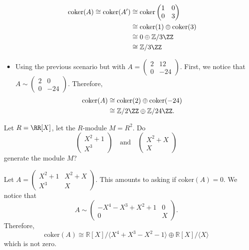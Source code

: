 \documentclass[12pt, a4paper]{article}
\begin{document}
\begin{mdexample}
\begin{itemize}
            \[
    \begin{aligned}
    \text{coker}(A) \cong \text{coker}(A') &\cong \text{coker}\begin{pmatrix} 1 & 0 \\ 0 & 3 \end{pmatrix} \\
    &\cong \text{coker}(1)\oplus \text{coker}(3) \\
    &\cong 0 \oplus \mathbb{Z}/3\ZZ\\
    &\cong \mathbb{Z}/3\ZZ
    \end{aligned}
    \]
    \item Using the previous scenario but with \(A = \begin{pmatrix} 2 & 12 \\ 0 & -24 \end{pmatrix}\). First, we notice that \(A \sim \begin{pmatrix} 2 & 0 \\ 0 & -24 \end{pmatrix}\). Therefore, 
    \[\begin{aligned}
        \text{coker}(A) &\cong \text{coker}(2) \oplus \text{coker}(-24) \\
        &\cong \mathbb{Z}/2\ZZ \oplus \mathbb{Z}/24\ZZ.
    \end{aligned}\]
    \end{itemize}
\end{mdexample}

\begin{mdexample}
    Let \(R = \RR[X]\), let the \(R\)-module \(M=R^2\). Do 
    \[\begin{pmatrix}
        X^2+1 \\ X^3
    \end{pmatrix} \quad \text{and} \quad \begin{pmatrix}
        X^2+X \\X
    \end{pmatrix}\]
    generate the module \(M\)?
    \begin{solution}
        Let \(A = \begin{pmatrix}
            X^2+1 &X^2+X\\ X^3 &X
        \end{pmatrix}\). This amounts to asking if \(\text{coker}(A)=0\). We notice that 
        \[A \sim \begin{pmatrix} -X^4-X^3+X^2+1 & 0 \\ 0 & X \end{pmatrix}.\]
        Therefore,
        \[\text{coker}(A) \cong \mathbb{R}[X] / \langle X^4+X^3-X^2-1 \rangle \oplus \mathbb{R}[X] / \langle X \rangle\]
        which is not zero.
    \end{solution}
\end{mdexample}
\end{document}
